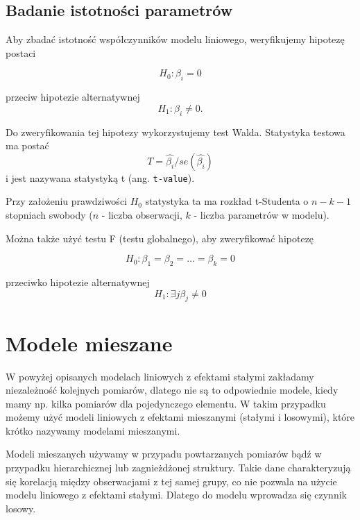 \documentclass[12pt]{mwbk}
\theoremstyle{plain}
\theoremstyle{definition}
\theoremstyle{remark}
\begin{document}
\subsection{Badanie istotności parametrów}

Aby zbadać istotność współczynników modelu liniowego, weryfikujemy hipotezę postaci

$$H_0: \beta_i = 0$$

przeciw hipotezie alternatywnej $$H_1: \beta_i \neq 0.																																																																																																																																																																																																																																																																																																																																																																																																																																																																																																																													$$

Do zweryfikowania tej hipotezy wykorzystujemy test Walda.
Statystyka testowa ma postać $$T=\hat{\beta_i}/se(\hat{\beta_i})$$
i jest nazywana statystyką t (ang. \texttt{t-value}).

Przy założeniu prawdziwości $H_0$ statystyka ta ma rozkład t-Studenta o $n-k-1$ stopniach swobody ($n$ - liczba obserwacji, $k$ - liczba parametrów w modelu).

Można także użyć testu F (testu globalnego), aby zweryfikować hipotezę

$$H_0: \beta_1=\beta_2=\ldots=\beta_k=0$$

przeciwko hipotezie alternatywnej
$$H_1: \exists{j} \beta_j \neq 0 $$

\section{Modele mieszane} 
W powyżej opisanych modelach liniowych z efektami stałymi zakładamy niezależność kolejnych pomiarów, dlatego nie są to odpowiednie modele, kiedy mamy np. kilka pomiarów dla pojedynczego elementu. W takim przypadku możemy użyć modeli liniowych z efektami mieszanymi (stałymi i losowymi), które krótko nazywamy modelami mieszanymi.

Modeli mieszanych używamy w przypadu powtarzanych pomiarów bądź w przypadku hierarchicznej lub zagnieżdżonej struktury. Takie dane charakteryzują się korelacją między obserwacjami z tej samej grupy, co nie pozwala na użycie modelu liniowego z efektami stałymi. Dlatego do modelu wprowadza się czynnik losowy. 
\end{document}
